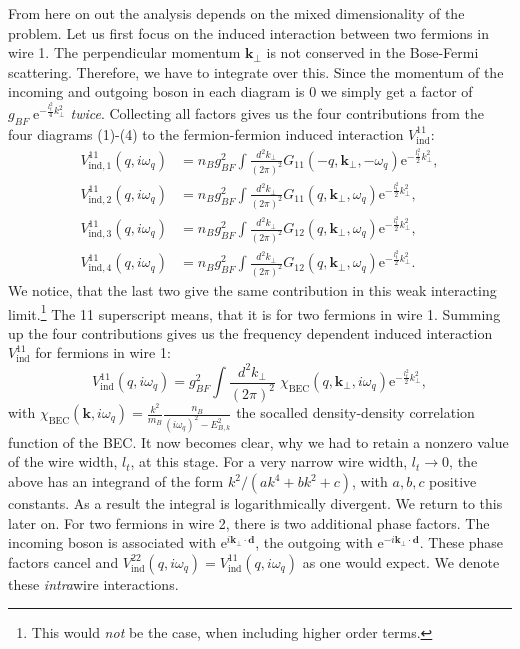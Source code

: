 From here on out the analysis depends on the mixed dimensionality of the problem. Let us first focus on the induced interaction between two fermions in wire 1. The perpendicular momentum $\mathbf{k}_{\perp}$ is not conserved in the Bose-Fermi scattering. Therefore, we have to integrate over this. Since the momentum of the incoming and outgoing boson in each diagram is 0 we simply get a factor of $g_{BF}\; \text{e}^{-\frac{l_t^2}{4}k_\perp^2}$ \textit{twice}. Collecting all factors gives us the four contributions from the four diagrams (1)-(4) to the fermion-fermion induced interaction $V_{\text{ind}}^{11}$: 
\begin{align}
V^{11}_{\text{ind}, 1}(q,i\omega_q) &= n_Bg_{BF}^2\int\frac{d^2k_\perp}{(2\pi)^2}G_{11}(-q,\mathbf{k}_\perp,-\omega_q)\text{e}^{-\frac{l_t^2}{2}k_\perp^2}, \nonumber \\
V^{11}_{\text{ind}, 2}(q,i\omega_q) &= n_Bg_{BF}^2\int\frac{d^2k_\perp}{(2\pi)^2}G_{11}(q,\mathbf{k}_\perp,\omega_q)\text{e}^{-\frac{l_t^2}{2}k_\perp^2}, \nonumber \\
V^{11}_{\text{ind}, 3}(q,i\omega_q) &= n_Bg_{BF}^2\int\frac{d^2k_\perp}{(2\pi)^2}G_{12}(q,\mathbf{k}_\perp,\omega_q)\text{e}^{-\frac{l_t^2}{2}k_\perp^2}, \nonumber \\
V^{11}_{\text{ind}, 4}(q,i\omega_q) &= n_Bg_{BF}^2\int\frac{d^2k_\perp}{(2\pi)^2}G_{12}(q,\mathbf{k}_\perp,\omega_q)\text{e}^{-\frac{l_t^2}{2}k_\perp^2}. 
\end{align}
We notice, that the last two give the same contribution in this weak interacting limit.\footnote{This would \textit{not} be the case, when including higher order terms.} The 11 superscript means, that it is for two fermions in wire 1. Summing up the four contributions gives us the frequency dependent induced interaction $V^{11}_{\text{ind}}$ for fermions in wire 1:
\begin{equation}
V^{11}_{\text{ind}}(q,i\omega_q) = g_{BF}^2\int\frac{d^2k_\perp}{(2\pi)^2}\; \chi_\text{BEC}(q,\mathbf{k}_\perp,i\omega_q)\text{e}^{-\frac{l_t^2}{2}k_\perp^2}, 
\label{eq.V11indXBEC}
\end{equation}
with $\chi_\text{BEC}(\mathbf{k},i\omega_q) = \frac{k^2}{m_B}\frac{n_B}{(i\omega_q)^2 - E_{B,k}^2}$ the socalled density-density correlation function of the BEC. It now becomes clear, why we had to retain a nonzero value of the wire width, $l_t$, at this stage. For a very narrow wire width, $l_t\to 0$, the above has an integrand of the form $k^2/(ak^4 + bk^2 + c)$, with $a, b, c$ positive constants. As a result the integral is logarithmically divergent. We return to this later on. For two fermions in wire 2, there is two additional phase factors. The incoming boson is associated with $\text{e}^{i\mathbf{k}_\perp\cdot \mathbf{d}}$, the outgoing with $\text{e}^{-i\mathbf{k}_\perp\cdot \mathbf{d}}$. These phase factors cancel and $V^{22}_{\text{ind}}(q,i\omega_q) = V^{11}_{\text{ind}}(q,i\omega_q)$ as one would expect. We denote these \textit{intra}wire interactions. 

